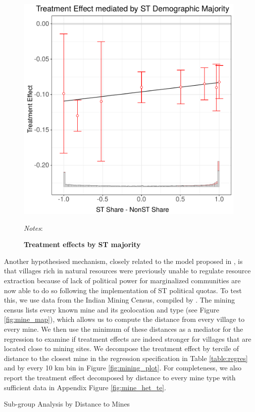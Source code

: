 \documentclass[12pt,reqno]{article}
\begin{document}
\begin{figure}[htbp!]
\begin{center}
\begin{minipage}{1 \linewidth}
  \caption{\textbf{Treatment effects by ST majority}\label{fig:intflex_stmaj}	}
  
\centerline{\includegraphics[width=3 in,angle=0]{Output/Interflex_stmaj.pdf}}
\smallskip
\scriptsize
\emph{Notes}: 
\end{minipage}
\end{center}
\end{figure}


Another hypothesised mechanism, closely related to the model proposed in \textcite{Burgess2012-hk}, is that villages rich in natural resources were previously unable to regulate resource extraction because of lack of political power for marginalized communities are now able to do so following the implementation of ST political quotas. To test this, we use data from the Indian Mining Census, compiled by \textcite{asher2019rent}. The mining census lists every known mine and its geolocation and type (see Figure \ref{fig:mine_map}), which allows us to compute the distance from every village to every mine. We then use the minimum of these distances as a mediator for the regression to examine if treatment effects are indeed stronger for villages that are located close to mining sites. We decompose the treatment effect by tercile of distance to the closest mine in the regression specification in Table \ref{table:regres} and by every 10 km bin in Figure \ref{fig:mining_plot}. For completeness, we also report the treatment effect decomposed by distance to every mine type with sufficient data in Appendix Figure \ref{fig:mine_het_te}.

\begin{centering}
\begin{table}[!htbp] \centering
  \caption{Sub-group Analysis by Distance to Mines}
  \label{table:regres}
  
\end{table}
\end{centering}
\end{document}
